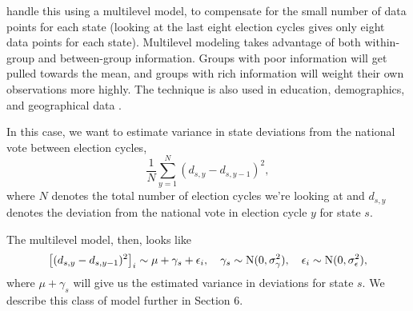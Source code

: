 \documentclass[thesis.tex]{subfiles}
\begin{document}
\cite{Lock:2010aa} handle this using a multilevel model, to compensate for the small number of data points for each state (looking at the last eight election cycles gives only eight data points for each state). Multilevel modeling takes advantage of both within-group and between-group information. Groups with poor information will get pulled towards the mean, and groups with rich information will weight their own observations more highly. The technique is also used in education, demographics, and geographical data \citep{Ghitza:2013aa,Gelman:2006aa,Aitkin:1981aa}.

In this case, we want to estimate variance in state deviations from the national vote between election cycles, \[
  \frac{1}{N}\sum_{y=1}^N (d_{s, y} - d_{s, y - 1})^2,
\] where \(N\) denotes the total number of election cycles we're looking at and \(d_{s, y}\) denotes the deviation from the national vote in election cycle \(y\) for state \(s\).

The multilevel model, then, looks like \begin{equation}
	\left[(d_{s, y} - d_{s, y - 1})^2\right]_i \sim \mu + \gamma_s + \epsilon_i, \quad
	\gamma_s \sim \operatorname{N}(0, \sigma_\gamma^2), \quad
	\epsilon_i \sim \operatorname{N}(0, \sigma_\epsilon^2),
\end{equation} where \(\mu + \gamma_s\) will give us the estimated variance in deviations for state \(s\). We describe this class of model further in Section 6.

\end{document}

